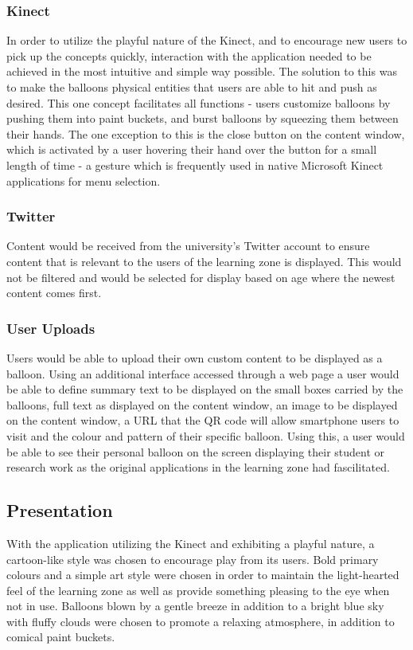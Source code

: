\documentclass[a4paper,11pt]{article}
\begin{document}
\begin{description}
\subsubsection{Kinect}
In order to utilize the playful nature of the Kinect, and to encourage new users to pick up the concepts quickly, interaction with the application needed to be achieved in the most intuitive and simple way possible. The solution to this was to make the balloons physical entities that users are able to hit and push as desired. This one concept facilitates all functions - users customize balloons by pushing them into paint buckets, and burst balloons by squeezing them between their hands. The one exception to this is the close button on the content window, which is activated by a user hovering their hand over the button for a small length of time - a gesture which is frequently used in native Microsoft Kinect applications for menu selection.

\subsubsection{Twitter}
Content would be received from the university's Twitter account to ensure content that is relevant to the users of the learning zone is displayed. This would not be filtered and would be selected for display based on age where the newest content comes first.

\subsubsection{User Uploads}
Users would be able to upload their own custom content to be displayed as a balloon. Using an additional interface accessed through a web page a user would be able to define summary text to be displayed on the small boxes carried by the balloons, full text as displayed on the content window, an image to be displayed on the content window, a URL that the QR code will allow smartphone users to visit and the colour and pattern of their specific balloon. Using this, a user would be able to see their personal balloon on the screen displaying their student or research work as the original applications in the learning zone had fascilitated.

\subsection{Presentation}
With the application utilizing the Kinect and exhibiting a playful nature, a cartoon-like style was chosen to encourage play from its users. Bold primary colours and a simple art style were chosen in order to maintain the light-hearted feel of the learning zone as well as provide something pleasing to the eye when not in use. Balloons blown by a gentle breeze in addition to a bright blue sky with fluffy clouds were chosen to promote a relaxing atmosphere, in addition to comical paint buckets.


\end{description}
\end{document}
